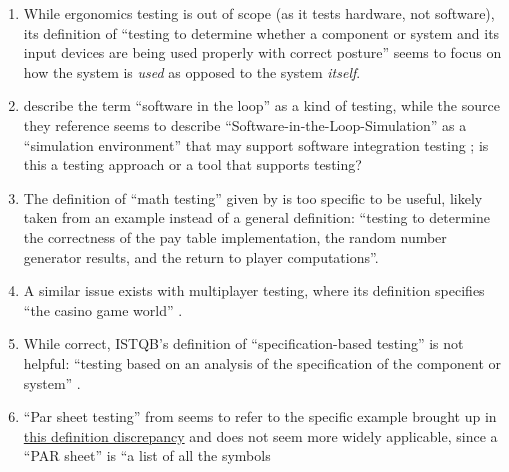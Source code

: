 \begin{enumerate}
    \item %
          While ergonomics testing is out of scope (as it tests hardware, not
          software), its definition of ``testing to determine whether a
          component or system and its input devices are being used properly
          with correct posture'' \citepISTQB{} seems to focus on how the
          system is \emph{used} as opposed to the system \emph{itself}.
    \item %
          \citetISTQB{} describe the term ``software in the loop'' as a
          kind of testing, while the source they reference
          seems to describe
          ``Software-in-the-Loop-Simulation'' as a ``simulation environment''
          that may support software integration testing
          \citep[p.~153]{SPICE2022}; is this a testing approach or a tool
          that supports testing?
    \item %
           \label{specificISTQB}
          The definition of ``math testing'' given by \citetISTQB{} is
          too specific to be useful, likely taken from an example instead of
          a general definition: ``testing to determine the correctness of the
          pay table implementation, the random number generator results, and
          the return to player computations''.
    \item %
          A similar issue exists with multiplayer testing, where its
          definition specifies ``the casino game world'' \citepISTQB{}.
    \item %
          While correct, ISTQB's definition of ``specification-based testing''
          is not helpful: ``testing based on an analysis of the specification
          of the component or system'' \citepISTQB{}.
    \item %
          ``Par sheet testing'' from \citepISTQB{} seems to refer to the
          specific example brought up in \hyperref[specificISTQB]
          {this definition discrepancy} and does not seem more widely
          applicable, since a ``PAR sheet'' is ``a list of all the symbols

\end{enumerate}
